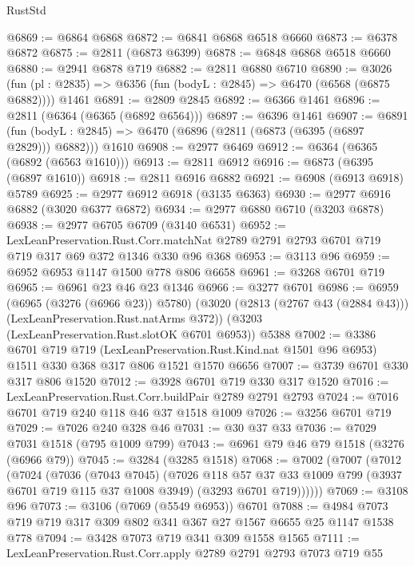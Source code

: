 \begin{lexlean}{RustStd}
\begin{coremodule}
@6869 := @6864 @6868
@6872 := @6841 @6868 @6518 @6660
@6873 := @6378 @6872
@6875 := @2811 (@6873 @6399)
@6878 := @6848 @6868 @6518 @6660
@6880 := @2941 @6878 @719
@6882 := @2811 @6880 @6710
@6890 := @3026
    (fun (pl : @2835) => @6356 (fun (bodyL : @2845) => @6470 (@6568 (@6875 @6882))))
    @1461
@6891 := @2809 @2845
@6892 := @6366 @1461
@6896 := @2811 (@6364 (@6365 (@6892 @6564)))
@6897 := @6396 @1461
@6907 := @6891
    (fun (bodyL : @2845) => @6470 (@6896 (@2811 (@6873 (@6395 (@6897 @2829))) @6882)))
    @1610
@6908 := @2977 @6469
@6912 := @6364 (@6365 (@6892 (@6563 @1610)))
@6913 := @2811 @6912
@6916 := @6873 (@6395 (@6897 @1610))
@6918 := @2811 @6916 @6882
@6921 := @6908 (@6913 @6918) @5789
@6925 := @2977 @6912 @6918 (@3135 @6363)
@6930 := @2977 @6916 @6882 (@3020 @6377 @6872)
@6934 := @2977 @6880 @6710 (@3203 @6878)
@6938 := @2977 @6705 @6709 (@3140 @6531)
@6952 := LexLeanPreservation.Rust.Corr.matchNat
    @2789
    @2791
    @2793
    @6701
    @719
    @719
    @317
    @69
    @372
    @1346
    @330
    @96
    @368
@6953 := @3113 @96
@6959 := @6952 @6953 @1147 @1500 @778 @806 @6658
@6961 := @3268 @6701 @719
@6965 := @6961 @23 @46 @23 @1346
@6966 := @3277 @6701
@6986 := @6959
    (@6965 (@3276 (@6966 @23)) @5780)
    (@3020 (@2813 (@2767 @43 (@2884 @43))) (LexLeanPreservation.Rust.natArms @372))
    (@3203 (LexLeanPreservation.Rust.slotOK @6701 @6953))
    @5388
@7002 := @3386
    @6701
    @719
    @719
    (LexLeanPreservation.Rust.Kind.nat @1501 @96 @6953)
    @1511
    @330
    @368
    @317
    @806
    @1521
    @1570
    @6656
@7007 := @3739 @6701 @330 @317 @806 @1520
@7012 := @3928 @6701 @719 @330 @317 @1520
@7016 := LexLeanPreservation.Rust.Corr.buildPair @2789 @2791 @2793
@7024 := @7016 @6701 @719 @240 @118 @46 @37 @1518 @1009
@7026 := @3256 @6701 @719
@7029 := @7026 @240 @328 @46
@7031 := @30 @37 @33
@7036 := @7029 @7031 @1518 (@795 @1009 @799)
@7043 := @6961 @79 @46 @79 @1518 (@3276 (@6966 @79))
@7045 := @3284 (@3285 @1518)
@7068 := @7002
    (@7007
      (@7012
        (@7024
          (@7036
            (@7043 @7045)
            (@7026
              @118
              @57
              @37
              @33
              @1009
              @799
              (@3937 @6701 @719 @115 @37 @1008 @3949)
              (@3293 @6701 @719))))))
@7069 := @3108 @96
@7073 := @3106 (@7069 (@5549 @6953)) @6701
@7088 := @4984 @7073 @719 @719 @317 @309 @802 @341 @367 @27 @1567 @6655 @25 @1147 @1538 @778
@7094 := @3428 @7073 @719 @341 @309 @1558 @1565
@7111 := LexLeanPreservation.Rust.Corr.apply
    @2789
    @2791
    @2793
    @7073
    @719
    @55

\end{coremodule}
\end{lexlean}
